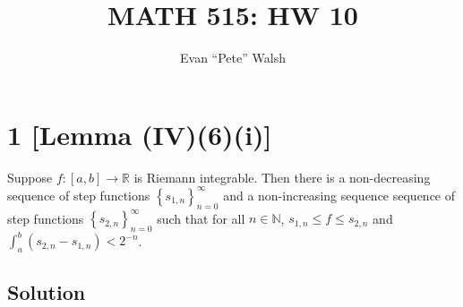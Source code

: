 \documentclass[12pt]{article}
\title{MATH 515: HW 10}
\author{Evan ``Pete'' Walsh}
\begin{document}

\section*{1 [Lemma (IV)(6)(i)]}
Suppose $f : [a,b] \rightarrow \mathbb{R}$ is Riemann integrable. Then there is a non-decreasing sequence of step functions $\left\{ s_{1,n}
\right\}_{n=0}^{\infty}$ and a non-increasing sequence sequence of step functions $\left\{ s_{2,n} \right\}_{n=0}^{\infty}$ such that for all $n \in
\mathbb{N}$, $s_{1,n} \leq f \leq s_{2,n}$ and $\int_{a}^{b}(s_{2,n} - s_{1,n}) < 2^{-n}$.

\subsection*{Solution}
\end{document}
